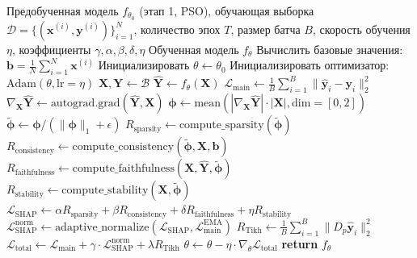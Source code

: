 \begin{algorithm}[H]
\caption{Обучение ANFIS с SHAP-регуляризацией (этап 2)}
\begin{algorithmic}[1]
\Require Предобученная модель $f_{\theta_0}$ (этап 1, PSO), обучающая выборка $\mathcal{D} = \{(\mathbf{x}^{(i)}, \mathbf{y}^{(i)})\}_{i=1}^{N}$, количество эпох $T$, размер батча $B$, скорость обучения $\eta$, коэффициенты $\gamma, \alpha, \beta, \delta, \eta$
\Ensure Обученная модель $f_{\theta}$
\State Вычислить базовые значения: $\mathbf{b} = \frac{1}{N} \sum_{i=1}^{N} \mathbf{x}^{(i)}$
\State Инициализировать $\theta \gets \theta_0$
\State Инициализировать оптимизатор: $\text{Adam}(\theta, \text{lr}=\eta)$
        \State $\mathbf{X}, \mathbf{Y} \gets \mathcal{B}$
        \State $\hat{\mathbf{Y}} \gets f_{\theta}(\mathbf{X})$ 
        \State $\mathcal{L}_{\text{main}} \gets \frac{1}{B} \sum_{i=1}^{B} \|\hat{\mathbf{y}}_i - \mathbf{y}_i\|_2^2$
        \State
        \State {}
        \State $\nabla_{\mathbf{X}} \hat{\mathbf{Y}} \gets \text{autograd.grad}(\hat{\mathbf{Y}}, \mathbf{X})$
        \State $\boldsymbol{\phi} \gets \text{mean}(|\nabla_{\mathbf{X}} \hat{\mathbf{Y}}| \cdot |\mathbf{X}|, \text{dim}=[0,2])$
        \State $\tilde{\boldsymbol{\phi}} \gets \boldsymbol{\phi} / (\|\boldsymbol{\phi}\|_1 + \epsilon)$
        \State
        \State {}
        \State $R_{\text{sparsity}} \gets \text{compute\_sparsity}(\tilde{\boldsymbol{\phi}})$
        \State $R_{\text{consistency}} \gets \text{compute\_consistency}(\tilde{\boldsymbol{\phi}}, \mathbf{X}, \mathbf{b})$ 
\State $R_{\text{faithfulness}} \gets \text{compute\_faithfulness}(\mathbf{X}, \hat{\mathbf{Y}}, \tilde{\boldsymbol{\phi}})$
\State $R_{\text{stability}} \gets \text{compute\_stability}(\mathbf{X}, \tilde{\boldsymbol{\phi}})$
\State
\State $\mathcal{L}_{\text{SHAP}} \gets \alpha R_{\text{sparsity}} + \beta R_{\text{consistency}} + \delta R_{\text{faithfulness}} + \eta R_{\text{stability}}$
\State $\mathcal{L}_{\text{SHAP}}^{\text{norm}} \gets \text{adaptive\_normalize}(\mathcal{L}_{\text{SHAP}}, \mathcal{L}_{\text{main}}^{\text{EMA}})$
\State $R_{\text{Tikh}} \gets \frac{1}{B} \sum_{i=1}^{B} \| D_p \hat{\mathbf{y}}_i \|_2^2$
\State $\mathcal{L}_{\text{total}} \gets \mathcal{L}_{\text{main}} + \gamma \cdot \mathcal{L}_{\text{SHAP}}^{\text{norm}} + \lambda R_{\text{Tikh}}$
        \State
        \State $\theta \gets \theta - \eta \cdot \nabla_{\theta} \mathcal{L}_{\text{total}}$ 
    \EndFor
\EndFor
\State \textbf{return} $f_{\theta}$
\end{algorithmic}
\end{algorithm}

